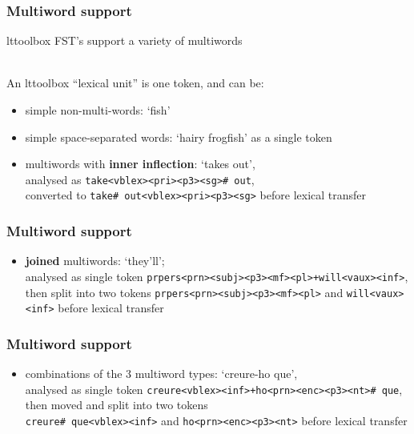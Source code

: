 \documentclass[notes=hide]{beamer}
\newcommand{\ana}[1]{\texttt{#1}}
\newcommand{\form}[1]{`#1'}
\begin{document}
\begin{frame}
  \frametitle{Multiword support}
  lttoolbox FST's support a variety of multiwords

  ~ \\

  An lttoolbox ``lexical unit'' is one token, and can be:
  \begin{itemize}
  \item simple non-multi-words: \form{fish}
  \item simple space-separated words: \form{hairy frogfish} as a
    single token
  \item multiwords with \textbf{inner inflection}: \form{takes out}, \\
    analysed as \ana{take<vblex><pri><p3><sg>\# out},\\
    converted to \ana{take\# out<vblex><pri><p3><sg>} before lexical
    transfer
  \end{itemize}
\end{frame}

\begin{frame}
  \frametitle{Multiword support}

  \begin{itemize}
  \item \textbf{joined} multiwords: \form{they'll}; \\
    analysed as single token \ana{prpers<prn><subj><p3><mf><pl>+will<vaux><inf>}, \\
    then split into two tokens \ana{prpers<prn><subj><p3><mf><pl>} and
    \ana{will<vaux><inf>} before lexical transfer
  \end{itemize}
\end{frame}

\begin{frame}
  \frametitle{Multiword support}
  \begin{itemize}
  \item combinations of the 3 multiword types:
    \form{creure-ho que},\\
    analysed as single token \ana{creure<vblex><inf>+ho<prn><enc><p3><nt>\# que}, \\
    then moved and split into two tokens \\
    \ana{creure\# que<vblex><inf>} and \ana{ho<prn><enc><p3><nt>}
    before lexical transfer
  \end{itemize}
\end{frame}
\end{document}
